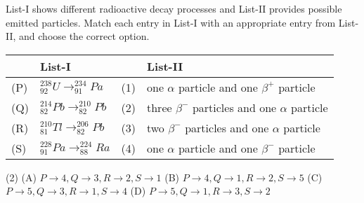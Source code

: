 \item List-I shows different radioactive decay processes and List-II provides possible emitted particles. Match each entry in List-I with an appropriate entry from List-II, and choose the correct option.

    \begin{center}
        \renewcommand{\arraystretch}{2}
        \begin{table}[h]
            \centering
            \begin{tabular}{p{0.25cm}p{7cm}|p{0.25cm}p{6cm}}
            \hline
            & List-I & & List-II \\
            \hline
            (P)& \( ^{238}_{92}U \rightarrow ^{234}_{91}Pa \) & (1) & one \(\alpha\) particle and one \(\beta^{+}\) particle \\
            (Q)& \( ^{214}_{82}Pb \rightarrow ^{210}_{82}Pb \) & (2) & three \(\beta^{-}\) particles and one \(\alpha\) particle \\
            (R)& \( ^{210}_{81}Tl \rightarrow ^{206}_{82}Pb \) & (3) & two \(\beta^{-}\) particles and one \(\alpha\) particle \\
            (S)& \( ^{228}_{91}Pa \rightarrow ^{224}_{88}Ra \) & (4) & one \(\alpha\) particle and one \(\beta^{-}\) particle \\
            \hline
            \end{tabular}
        \end{table}
    \end{center}

    \begin{tasks}(2)
        \task (A) \( P \rightarrow 4, Q \rightarrow 3, R \rightarrow 2, S \rightarrow 1 \) \ans
        \task (B) \( P \rightarrow 4, Q \rightarrow 1, R \rightarrow 2, S \rightarrow 5 \)
        \task (C) \( P \rightarrow 5, Q \rightarrow 3, R \rightarrow 1, S \rightarrow 4 \)
        \task (D) \( P \rightarrow 5, Q \rightarrow 1, R \rightarrow 3, S \rightarrow 2 \)
    \end{tasks}